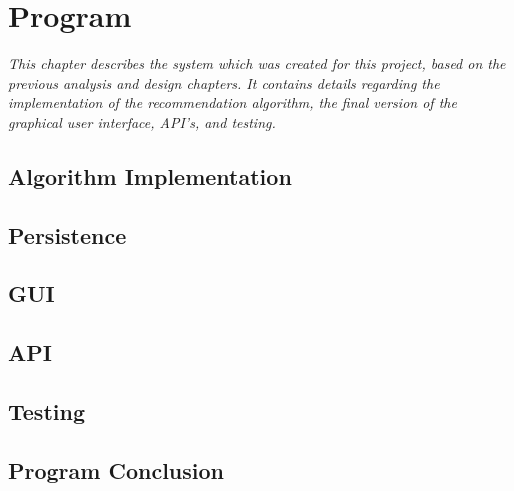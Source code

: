 \chapter{Program}

\textit{This chapter describes the system which was created for this project, based on the previous analysis and design chapters. It contains details regarding the implementation of the recommendation algorithm, the final version of the graphical user interface, API's, and testing.}

\section{Algorithm Implementation}
\label{AlgorithmProg}

\section{Persistence}
\label{Persistence}

\section{GUI}
\label{GUI}

\section{API}
\label{API}

\section{Testing}
\label{Testing}

\section{Program Conclusion}
\label{ProCon}
